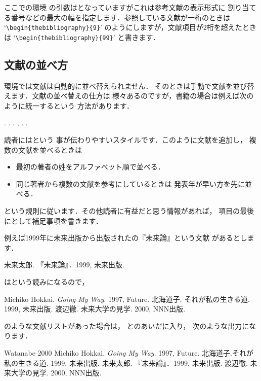 ここでの環境
の引数はとなっていますがこれは参考文献の表示形式に
割り当てる番号などの最大の幅を指定します．参照している文献が一桁のときは
`\verb|\begin{thebibliography}{9}|'
のようにしますが，文献項目が2桁を超えたときは
`\verb|\begin{thebibliography}{99}|'
と書きます．

\subsection{文献の並べ方}

環境では文献は自動的に並べ替えられません．
そのときは手動で文献を並び替えます．文献の並べ替えの仕方は
様々あるのですが，書籍の場合は例えば次のように統一するという
方法があります．

\begin{Syntax}
 . 
 . . , 
 . .
\end{Syntax}

読者にはという
事が伝わりやすいスタイルです．このように文献を追加し，
複数の文献を並べるときは
\begin{itemize}
 \item 最初の著者の姓をアルファベット順で並べる．
 \item 同じ著者から複数の文献を参考にしているときは
       発表年が早い方を先に並べる．
\end{itemize}
という規則に従います．その他読者に有益だと思う情報があれば，
項目の最後にとして補足事項を書きます．

例えば1999年に未来出版から出版されたの『未来論』という文献
があるとします．
\begin{InText}
  未来太郎. 『未来論』．1999, 未来出版. 
\end{InText}
はという読みになるので，
\begin{InText}
\begin{thebibliography}{Watanabe 2000}
  Michiko Hokkai. 
   \emph{Going My Way}. 1997, Future.
  北海道子.
   それが私の生きる道. 1999, 未来出版.
  渡辺徹. 
   未来大学の見学. 2000, NNN出版.
\end{thebibliography}
\end{InText}
のような文献リストがあった場合は，
\qu{[Hokkai 1999]}と\qu{[Watanabe 2000]}のあいだに入り，
次のような出力になります．
\begin{OutText}
\begin{mybibliography}{Watanabe 2000}
   Michiko Hokkai. \emph{Going My Way}. 1997, Future.
   北海道子.それが私の生きる道. 1999, 未来出版.
   未来太郎. 『未来論』．1999, 未来出版. 
  渡辺徹. 未来大学の見学. 2000, NNN出版.
\end{mybibliography}
\end{OutText}


